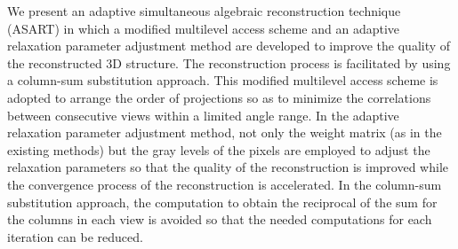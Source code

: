 \documentclass{report}
\begin{document}
We present an adaptive simultaneous algebraic reconstruction technique
(ASART) in which a modified multilevel access scheme and an adaptive
relaxation parameter adjustment method are developed to improve the
quality of the reconstructed 3D structure. The reconstruction process is
facilitated by using a column-sum substitution approach. This modified
multilevel access scheme is adopted to arrange the order of projections
so as to minimize the correlations between consecutive views within a
limited angle range. In the adaptive relaxation parameter adjustment
method, not only the weight matrix (as in the existing methods) but the
gray levels of the pixels are employed to adjust the relaxation
parameters so that the quality of the reconstruction is improved while
the convergence process of the reconstruction is accelerated. In the
column-sum substitution approach, the computation to obtain the
reciprocal of the sum for the columns in each view is avoided so that the
needed computations for each iteration can be reduced.
\end{document}
